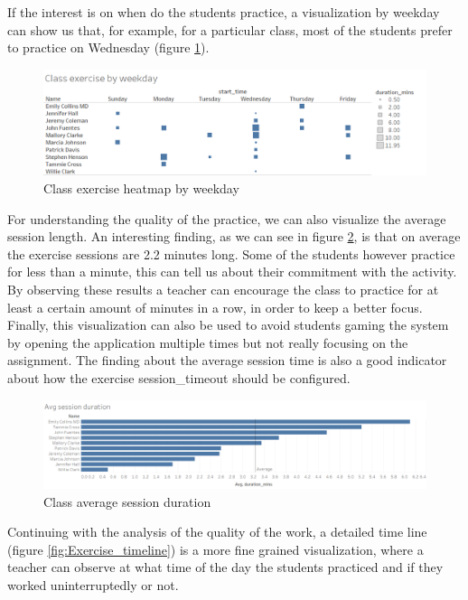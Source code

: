 If the interest is on when do the students practice, a visualization by weekday can show us that, for example, for a particular class, most of the students prefer to practice on Wednesday (figure \ref{fig:Class_exercise_by_weekday}).

\begin{figure}[bth]
	\centering
	\includegraphics[width=0.7\linewidth]{gfx/Class_exercise_by_weekday}
	\caption{Class exercise heatmap by weekday}
	\label{fig:Class_exercise_by_weekday}
\end{figure}

For understanding the quality of the practice, we can also visualize the average session length. An interesting finding, as we can see in figure \ref{fig:Avg_exercise_session_duration}, is that on average the exercise sessions are 2.2 minutes long. Some of the students however practice for less than a minute, this can tell us about their commitment with the activity. By observing these results a teacher can encourage the class to practice for at least a certain amount of minutes in a row, in order to keep a better focus. Finally, this visualization can also be used to avoid students gaming the system by opening the application multiple times but not really focusing on the assignment.
The finding about the average session time is also a good indicator about how the exercise session\_timeout should be configured.

\begin{figure}[bth]
	\centering
	\includegraphics[width=0.7\linewidth]{gfx/Avg_exercise_session_duration}
	\caption{Class average session duration}
	\label{fig:Avg_exercise_session_duration}
\end{figure}

Continuing with the analysis of the quality of the work, a detailed time line (figure \ref{fig:Exercise_timeline}) is a more fine grained visualization, where a teacher can observe at what time of the day the students practiced and if they worked uninterruptedly or not.

